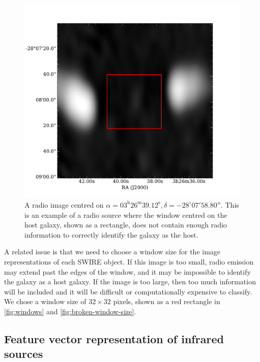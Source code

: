 \documentclass[fleqn,usenatbib,usedcolumn]{mnras}
\newcommand{\text}{\mathrm}
\begin{document}
    \begin{figure}
      \centering
      \includegraphics[width=\linewidth]{images/ARG0003sky_radio}
      \caption{A radio image centred on $\alpha =
        03^\text{h}26^\text{m}39.12^\text{s}, \delta = -28^\circ{}07'58.80''$.        %
        This is an example of a radio source where the window centred on the
        host galaxy, shown as a rectangle, does not contain enough radio
        information to correctly identify the galaxy as the host.}
      \label{fig:broken-window-size}
    \end{figure}

    A related issue is that we need to choose a window size for the image
    representations of each SWIRE object. If this image is too small, radio
    emission may extend past the edges of the window, and it may be impossible
    to identify the galaxy as a host galaxy. If the image is too large, then
    too much information will be included and it will be difficult or
    computationally expensive to classify. We chose a window size of $32
    \times 32$ pixels, shown as a red rectangle in
    \autoref{fig:windows} and \autoref{fig:broken-window-size}.

  \subsection{Feature vector representation of infrared sources}
  \label{vector-representation-of-infrared-sources}
\end{document}
